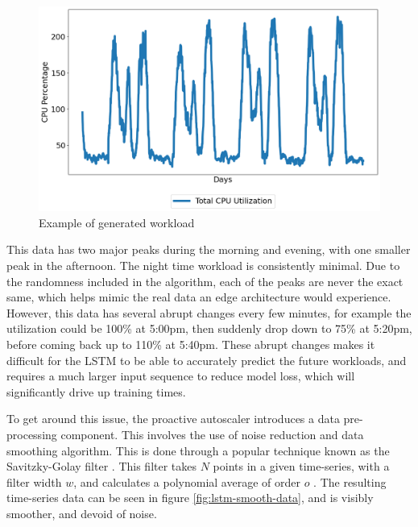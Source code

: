 \begin{figure}[htb]
    \centering
    \caption{Example of generated workload}
    \label{fig:lstm-init-data}
    \includegraphics[width=1.0\linewidth]{Figures/LSTM-Initial-Data.png}
\end{figure}

This data has two major peaks during the morning and evening, with one smaller peak in the afternoon. The night time workload is consistently minimal. Due to the randomness included in the algorithm, each of the peaks are never the exact same, which helps mimic the real data an edge architecture would experience. However, this data has several abrupt changes every few minutes, for example the utilization could be 100\% at 5:00pm, then suddenly drop down to 75\% at 5:20pm, before coming back up to 110\% at 5:40pm. These abrupt changes makes it difficult for the LSTM to be able to accurately predict the future workloads, and requires a much larger input sequence to reduce model loss, which will significantly drive up training times.\par

To get around this issue, the proactive autoscaler introduces a data pre-processing component. This involves the use of noise reduction and data smoothing algorithm. This is done through a popular technique known as the Savitzky-Golay filter \cite{savitzky1964smoothing}. This filter takes $N$ points in a given time-series, with a filter width $w$, and calculates a polynomial average of order $o$ \cite{schafer2011savitzky}. The resulting time-series data can be seen in figure \ref{fig:lstm-smooth-data}, and is visibly smoother, and devoid of noise.\par

